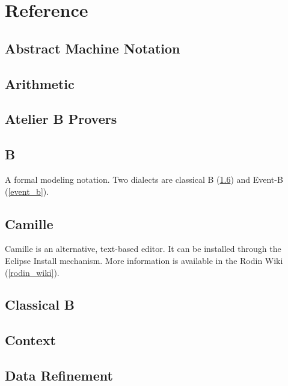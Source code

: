 \chapter{Reference}
\label{reference}



\section{Abstract Machine Notation}
\label{abstract_machine_notation}

\section{Arithmetic}
\label{arithmetic}

\section{Atelier B Provers}
\label{atelier_b_provers}

\section{B}
\label{b}

A formal modeling notation.  Two dialects are classical B (\ref{classical_b}) and Event-B (\ref{event_b}).

\section{Camille}
\label{camille}

Camille is an alternative, text-based editor.  It can be installed through the Eclipse Install mechanism.  More information is available in the Rodin Wiki (\ref{rodin_wiki}).

\section{Classical B}
\label{classical_b}

\section{Context}
\label{context}

\section{Data Refinement}
\label{data_refinement}

